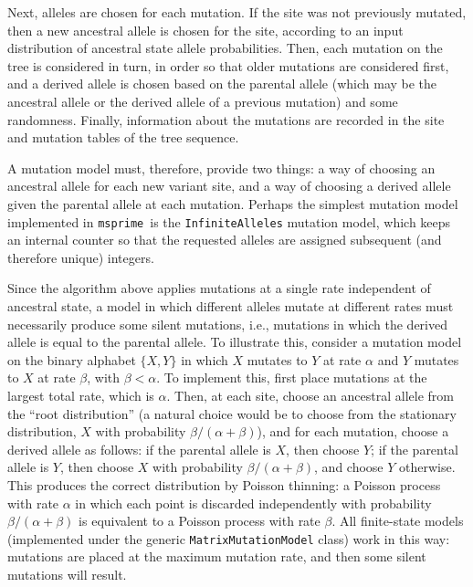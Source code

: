 \documentclass{article}
\newcommand{\msprime}[0]{\texttt{msprime}}
\begin{document}
Next, alleles are chosen for each mutation.
If the site was not previously mutated, then a new ancestral allele is chosen for the site,
according to an input distribution of ancestral state allele probabilities.
Then, each mutation on the tree is considered in turn,
in order so that older mutations are considered first,
and a derived allele is chosen based on the parental allele
(which may be the ancestral allele or the derived allele of a previous mutation)
and some randomness.
Finally, information about the mutations are recorded in the site and mutation tables
of the tree sequence.

A mutation model must, therefore, provide two things:
a way of choosing an ancestral allele for each new variant site,
and a way of choosing a derived allele given the parental allele at each mutation.
Perhaps the simplest mutation model implemented in \msprime\ is the
\texttt{InfiniteAlleles} mutation model,
which keeps an internal counter so that the requested alleles are
assigned subsequent (and therefore unique) integers.

Since the algorithm above applies mutations at a single rate
independent of ancestral state,
a model in which different alleles mutate at different rates
must necessarily produce some silent mutations,
i.e., mutations in which the derived allele is equal to the parental allele.
To illustrate this, consider a mutation model on the binary alphabet
$\{X, Y\}$ in which $X$ mutates to $Y$ at rate $\alpha$
and $Y$ mutates to $X$ at rate $\beta$, with $\beta < \alpha$.
To implement this, first place mutations at the largest total rate, which is $\alpha$.
Then, at each site, choose an ancestral allele from the ``root distribution''
(a natural choice would be to choose from the stationary distribution,
$X$ with probability $\beta / (\alpha + \beta)$),
and for each mutation, choose a derived allele as follows:
if the parental allele is $X$, then choose $Y$;
if the parental allele is $Y$, then choose $X$ with probability $\beta/(\alpha + \beta)$,
and choose $Y$ otherwise.
This produces the correct distribution by Poisson thinning:
a Poisson process with rate $\alpha$ in which each point is discarded independently
with probability $\beta / (\alpha + \beta)$ is equivalent to a Poisson
process with rate $\beta$.
All finite-state models (implemented under the generic \texttt{MatrixMutationModel} class)
work in this way: mutations are placed at the maximum mutation rate,
and then some silent mutations will result.
\end{document}
